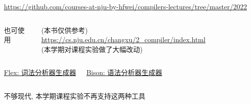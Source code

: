 \begin{frame}{}
  \begin{center}

    \vspace{0.50cm}
    \url{https://github.com/courses-at-nju-by-hfwei/compilers-lectures/tree/master/2022}
  \end{center}
\end{frame}

\begin{frame}{}
  \begin{columns}
    \begin{center}
      也可使用
    \end{center}
    \begin{center}
      (本书仅供参考)
      \url{https://cs.nju.edu.cn/changxu/2_compiler/index.html} \\[3pt]
      (本学期对课程实验做了大幅改动)
    \end{center}
  \end{columns}
\end{frame}

\begin{frame}{}
  \begin{columns}
    \begin{center}
      \href{https://en.wikipedia.org/wiki/Flex_(lexical_analyser_generator)}{Flex: 词法分析器生成器}
    \end{center}
    \begin{center}
      \href{https://en.wikipedia.org/wiki/GNU_Bison}{Bison: 语法分析器生成器}
    \end{center}
  \end{columns}

  \vspace{0.50cm}
  \begin{center}
    不够现代, 本学期课程实验不再支持这两种工具
  \end{center}
\end{frame}

